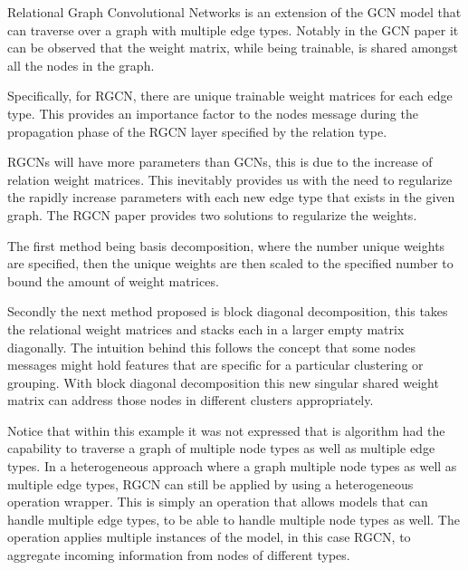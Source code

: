 Relational Graph Convolutional Networks is an extension of the GCN model that can traverse over a graph with multiple edge types. Notably in the GCN paper it can be observed that the weight matrix, while being trainable, is shared amongst all the nodes in the graph. 

Specifically, for RGCN, there are unique trainable weight matrices for each edge type. This provides an importance factor to the nodes message during the propagation phase of the RGCN layer specified by the relation type. \cite{rgcn2017}





RGCNs will have more parameters than GCNs, this is due to the increase of relation weight matrices. This inevitably provides us with the need to regularize the rapidly increase parameters with each new edge type that exists in the given graph. The RGCN paper provides two solutions to regularize the weights.

The first method being basis decomposition, where the number unique weights are specified, then the unique weights are then scaled to the specified number to bound the amount of weight matrices.



Secondly the next method proposed is block diagonal decomposition, this takes the relational weight matrices and stacks each in a larger empty matrix diagonally. The intuition behind this follows the concept that some nodes messages might hold features that are specific for a particular clustering or grouping. With block diagonal decomposition this new singular shared weight matrix can address those nodes in different clusters appropriately.

Notice that within this example it was not expressed that is algorithm had the capability to traverse a graph of multiple node types as well as multiple edge types. In a heterogeneous approach where a graph multiple node types as well as multiple edge types, RGCN can still be applied by using a heterogeneous operation wrapper. This is simply an operation that allows models that can handle multiple edge types, to be able to handle multiple node types as well. The operation applies multiple instances of the model, in this case RGCN, to aggregate incoming information from nodes of different types.

